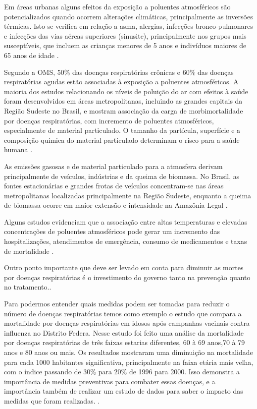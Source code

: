 \documentclass[journal]{IEEEtran}
\begin{document}
Em áreas urbanas alguns efeitos da exposição a poluentes  atmosféricos  são  potencializados  quando  ocorrem alterações  climáticas,  principalmente  as  inversões  térmicas.  Isto  se  verifica  em  relação  a  asma,  alergias,  infecções bronco-pulmonares e infecções das vias aéreas superiores  (sinusite),  principalmente  nos  grupos  mais susceptíveis, que incluem as crianças menores de 5 anos e indivíduos maiores de 65 anos de idade \cite{mudanças}.

Segundo a OMS, 50\% das doenças respiratórias crônicas e 60\% das doenças respiratórias agudas estão associadas à exposição a poluentes atmosféricos. A maioria dos estudos relacionando os níveis de poluição do ar com efeitos à saúde foram desenvolvidos em áreas metropolitanas, incluindo  as  grandes  capitais  da  Região  Sudeste  no  Brasil,  e mostram associação da carga de morbimortalidade por doenças  respiratórias,  com  incremento  de  poluentes atmosféricos,  especialmente  de  material  particulado. O tamanho da partícula, superfície e a composição química do material particulado determinam o risco para a saúde humana \cite{mudanças}.

As emissões gasosas e de material particulado para a atmosfera derivam principalmente de veículos, indústrias e da queima de biomassa. No Brasil, as fontes estacionárias  e  grandes  frotas  de  veículos  concentram-se nas áreas metropolitanas localizadas principalmente na Região Sudeste, enquanto a queima de biomassa ocorre em maior extensão e intensidade na Amazônia Legal \cite{mudanças}.

Alguns estudos evidenciam que a associação entre altas temperaturas e elevadas concentrações de poluentes  atmosféricos  pode  gerar  um  incremento  das  hospitalizações,  atendimentos  de  emergência,  consumo de medicamentos e taxas de mortalidade \cite{mudanças}.

Outro ponto importante que deve ser levado em conta para diminuir as mortes por doenças respiratórias é o investimento do governo tanto na prevenção quanto no tratamento.\cite{campanha_vacinais}.

Para podermos entender quais medidas podem ser tomadas para reduzir o número de doenças respiratórias temos como exemplo o estudo que compara a mortalidade por doenças respiratórias em idosos após campanhas vacinais contra influenza no Distrito Federa. Nesse estudo foi feito uma análise da mortalidade por doenças respiratórias de três faixas estarias diferentes, 60 à 69 anos,70 à 79 anos e 80 anos ou mais. Os resultados mostraram uma diminuição na mortalidade para cada 1000 habitantes significativa, principalmente na faixa etária mais velha, com o índice passando de 30\% para 20\% de 1996 para 2000. Isso demonstra a importância de medidas preventivas para combater essas doenças, e a importância também de realizar um estudo de dados para saber o impacto das medidas que foram realizadas.     \cite{campanha_vacinais}.
\end{document}
